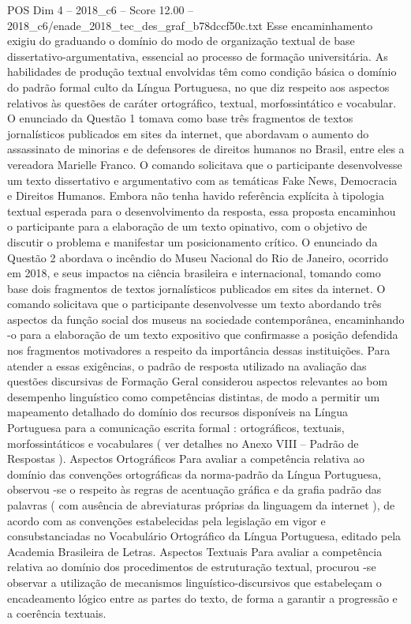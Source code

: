 \begin{textsample}{POS Dim 4 – 2018\_c6 – Score 12.00 – 2018\_c6/enade\_2018\_tec\_des\_graf\_b78dccf50c.txt}
Esse encaminhamento exigiu do graduando o domínio do modo de organização textual de base dissertativo-argumentativa, essencial ao processo de formação universitária.
As habilidades de produção textual envolvidas têm como condição básica o domínio do padrão formal culto da Língua Portuguesa, no que diz respeito aos aspectos relativos às questões de caráter ortográfico, textual, morfossintático e vocabular.
O enunciado da Questão 1 tomava como base três fragmentos de textos jornalísticos publicados em sites da internet, que abordavam o aumento do assassinato de minorias e de defensores de direitos humanos no Brasil, entre eles a vereadora Marielle Franco.
O comando solicitava que o participante desenvolvesse um texto dissertativo e argumentativo com as temáticas Fake News, Democracia e Direitos Humanos.
Embora não tenha havido referência explícita à tipologia textual esperada para o desenvolvimento da resposta, essa proposta encaminhou o participante para a elaboração de um texto opinativo, com o objetivo de discutir o problema e manifestar um posicionamento crítico.
O enunciado da Questão 2 abordava o incêndio do Museu Nacional do Rio de Janeiro, ocorrido em 2018, e seus impactos na ciência brasileira e internacional, tomando como base dois fragmentos de textos jornalísticos publicados em sites da internet.
O comando solicitava que o participante desenvolvesse um texto abordando três aspectos da função social dos museus na sociedade contemporânea, encaminhando -o para a elaboração de um texto expositivo que confirmasse a posição defendida nos fragmentos motivadores a respeito da importância dessas instituições.
Para atender a essas exigências, o padrão de resposta utilizado na avaliação das questões discursivas de Formação Geral considerou aspectos relevantes ao bom desempenho linguístico como competências distintas, de modo a permitir um mapeamento detalhado do domínio dos recursos disponíveis na Língua Portuguesa para a comunicação escrita formal : ortográficos, textuais, morfossintáticos e vocabulares ( ver detalhes no Anexo VIII – Padrão de Respostas ).
Aspectos Ortográficos Para avaliar a competência relativa ao domínio das convenções ortográficas da norma-padrão da Língua Portuguesa, observou -se o respeito às regras de acentuação gráfica e da grafia padrão das palavras ( com ausência de abreviaturas próprias da linguagem da internet ), de acordo com as convenções estabelecidas pela legislação em vigor e consubstanciadas no Vocabulário Ortográfico da Língua Portuguesa, editado pela Academia Brasileira de Letras.
Aspectos Textuais Para avaliar a competência relativa ao domínio dos procedimentos de estruturação textual, procurou -se observar a utilização de mecanismos linguístico-discursivos que estabeleçam o encadeamento lógico entre as partes do texto, de forma a garantir a progressão e a coerência textuais.

\end{textsample}
